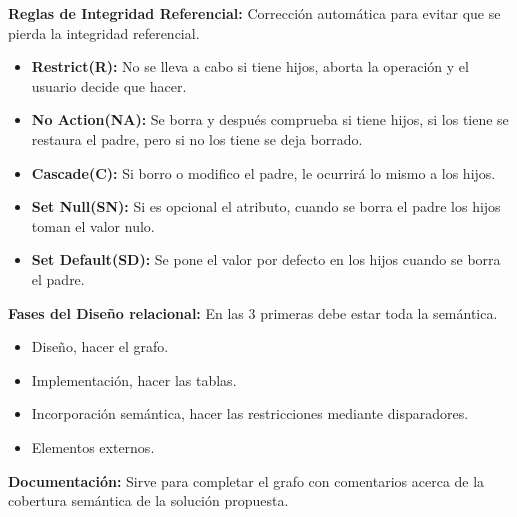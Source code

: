 \documentclass[12pt, twoside, openright]{report} %
\begin{document}
  
  \textbf{Reglas de Integridad Referencial:} Corrección automática para
  evitar que se pierda la integridad referencial.
  

  \begin{itemize}
  \item \textbf{Restrict(R):} No se lleva a cabo si tiene hijos, aborta la
    operación y el usuario decide que hacer.
    
  \item \textbf{No Action(NA):} Se borra y después comprueba si tiene hijos,
    si los tiene se restaura el padre, pero si no los tiene se deja
    borrado.
    
  \item \textbf{Cascade(C):} Si borro o modifico el padre, le ocurrirá lo
    mismo a los hijos.
    
  \item \textbf{Set Null(SN):} Si es opcional el atributo, cuando se borra
    el padre los hijos toman el valor nulo.
    
  \item \textbf{Set Default(SD):} Se pone el valor por defecto en los hijos
    cuando se borra el padre.
    
  \end{itemize}

  
  \textbf{Fases del Diseño relacional:} En las 3 primeras debe estar
  toda la semántica.
  

  \begin{itemize}
  \item Diseño, hacer el grafo.
    
  \item Implementación, hacer las tablas.
    
  \item Incorporación semántica, hacer las restricciones mediante
    disparadores.
    
  \item Elementos externos.
    
  \end{itemize}

  
  \textbf{Documentación:} Sirve para completar el grafo con comentarios
  acerca de la cobertura semántica de la solución propuesta.
  
\end{document}
